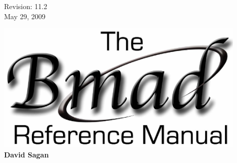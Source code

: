 \thispagestyle{empty}

\begin{flushright}
\large
  Revision: 11.2 \\
  May 29, 2009 \\
\end{flushright}

\vfill

{
\begin{center}
\includegraphics[width=12cm]{bmad-ref-manual.eps} \\
\vskip 0.3in
\huge\bf David Sagan
\end{center}
}

\vfill
\break

